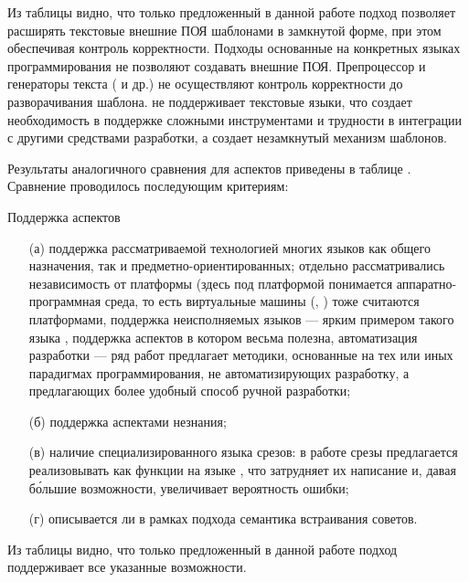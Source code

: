 Из таблицы видно, что только предложенный в данной работе подход позволяет расширять текстовые внешние ПОЯ шаблонами в замкнутой форме, при этом обеспечивая контроль корректности. Подходы основанные на конкретных языках программирования не позволяют создавать внешние ПОЯ. Препроцессор  и генераторы текста ( и др.) не осуществляют контроль корректности до разворачивания шаблона.  не поддерживает текстовые языки, что создает необходимость в поддержке сложными инструментами и трудности в интеграции с другими средствами разработки, а  создает незамкнутый механизм шаблонов.

Результаты аналогичного сравнения для аспектов приведены в таблице .  Сравнение проводилось последующим критериям:
\begin{table}[htb]
	\centering
\newcommand{\dissonly}[1]{#1}

	\caption{Поддержка аспектов}\label{AspTable}
\end{table}
\begin{itemize}
	\item[(а)] поддержка рассматриваемой технологией многих языков как общего назначения, так и предметно-ориентированных; отдельно рассматривались 
		независимость от платформы (здесь под платформой понимается аппаратно-программная среда, то есть виртуальные машины (, ) тоже считаются платформами,
		поддержка неисполняемых языков --- ярким примером такого языка \GRM{}, поддержка аспектов в котором весьма полезна,
		автоматизация разработки --- ряд работ предлагает методики, основанные на тех или иных парадигмах программирования, не автоматизирующих разработку, а предлагающих более удобный способ ручной разработки;
	\item[(б)] поддержка аспектами незнания;
	\item[(в)] наличие специализированного языка срезов: в работе \cite{VanWyk03} срезы предлагается реализовывать как функции на языке , что затрудняет их написание и, давая б\'{о}льшие возможности, увеличивает вероятность ошибки;
	\item[(г)] описывается ли в рамках подхода семантика встраивания советов.
\end{itemize}
Из таблицы видно, что только предложенный в данной работе подход поддерживает все указанные возможности.

